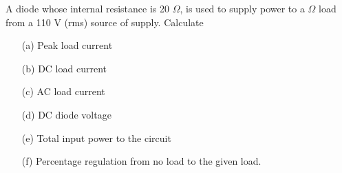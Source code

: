 \begin{example}\label{exam2.3}
A diode whose internal resistance is 20 $\Omega$, is used to supply
power to a $\Omega$ load from a 110 V (rms) source of
supply. Calculate
\begin{itemize}
\item[(a)] Peak load current

\item[(b)] DC load current

\item[(c)] AC load current 

\item[(d)] DC diode voltage

\item[(e)] Total input power to the circuit

\item[(f)] Percentage regulation from no load to the given load. 
\end{itemize} 
\end{example}


